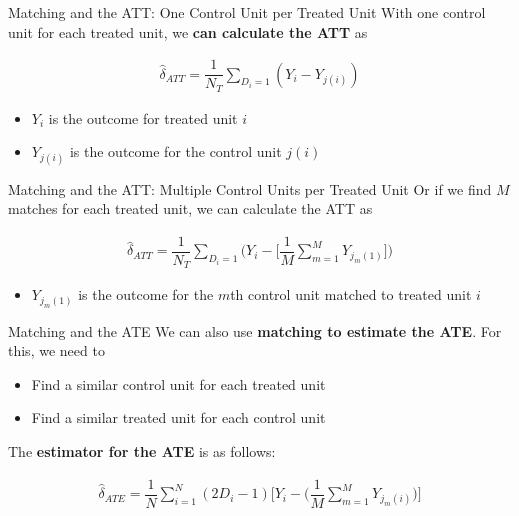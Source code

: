 \documentclass[
  ignorenonframetext,
  aspectratio=169, handout]{beamer}
\providecommand{\tightlist}{%
  \setlength{\itemsep}{0pt}\setlength{\parskip}{0pt}}
\newcommand{\brf}[1]{\textcolor{brickred}{\textbf{#1}}}
\begin{document}
\begin{frame}{Matching and the ATT: One Control Unit per Treated Unit}
\protect\hypertarget{matching-and-the-att-one-control-unit-per-treated-unit}{}
With one control unit for each treated unit, we
\brf{can calculate the ATT} as

\begin{align*}
\widehat{\delta}_{ATT} = \dfrac{1}{N_T} \sum_{D_i=1}(Y_i - Y_{j(i)})
\end{align*}

\begin{itemize}
\tightlist
\item
  \(Y_i\) is the outcome for treated unit \(i\)
\item
  \(Y_{j(i)}\) is the outcome for the control unit \(j(i)\)
\end{itemize}
\end{frame}

\begin{frame}{Matching and the ATT: Multiple Control Units per Treated
Unit}
\protect\hypertarget{matching-and-the-att-multiple-control-units-per-treated-unit}{}
Or if we find \(M\) matches for each treated unit, we can calculate the
ATT as

\begin{align*}
\widehat{\delta}_{ATT} = \dfrac{1}{N_T} \sum_{D_i=1} \bigg ( Y_i - \bigg [\dfrac{1}{M} \sum_{m=1}^M Y_{j_m(1)} \bigg ] \bigg )
\end{align*}

\begin{itemize}
\tightlist
\item
  \(Y_{j_m(1)}\) is the outcome for the \(m\)th control unit matched to
  treated unit \(i\)
\end{itemize}
\end{frame}

\begin{frame}{Matching and the ATE}
\protect\hypertarget{matching-and-the-ate}{}
We can also use \brf{matching to estimate the ATE}. For this, we need to

\begin{itemize}
\tightlist
\item
  Find a similar control unit for each treated unit
\item
  Find a similar treated unit for each control unit
\end{itemize}

\vfill

The \brf{estimator for the ATE} is as follows:

\begin{align*}
\widehat{\delta}_{ATE} = \dfrac{1}{N} \sum_{i=1}^N (2D_i - 1) \bigg [ Y_i - \bigg ( \dfrac{1}{M} \sum_{m=1}^M Y_{j_m(i)} \bigg ) \bigg ]
\end{align*}
\end{frame}
\end{document}
